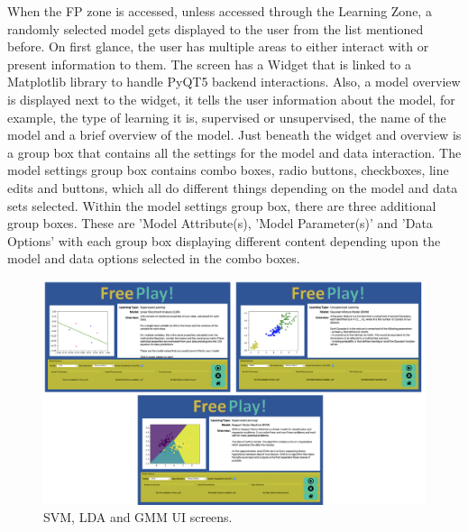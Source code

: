 		When the FP zone is accessed, unless accessed through the Learning Zone, a randomly selected model gets displayed to the user from the list mentioned before. On first glance, the user has multiple areas to either interact with or present information to them. The screen has a Widget that is linked to a Matplotlib library to handle PyQT5 backend interactions. Also, a model overview is displayed next to the widget, it tells the user information about the model, for example, the type of learning it is, supervised or unsupervised, the name of the model and a brief overview of the model. Just beneath the widget and overview is a group box that contains all the settings for the model and data interaction. The model settings group box contains combo boxes, radio buttons, checkboxes,  line edits and buttons, which all do different things depending on the model and data sets selected. Within the model settings group box, there are three additional group boxes. These are 'Model Attribute(s), 'Model Parameter(s)' and 'Data Options' with each group box displaying different content depending upon the model and data options selected in the combo boxes.
		
		\begin{figure}[t]
			\begin{center}
				\includegraphics[width=15cm]{graphics/remaining_fp_examples.png}
				\caption{SVM, LDA and GMM UI screens.}
				\label{fig:others_example}
			\end{center}
		\end{figure}
		
